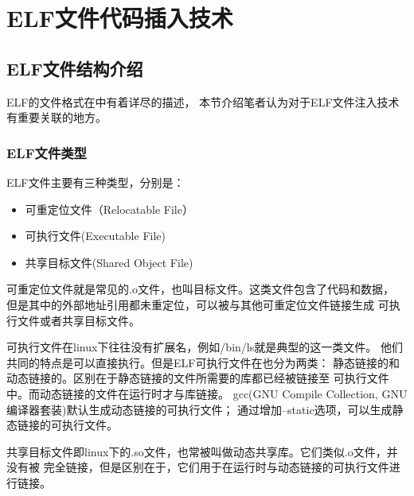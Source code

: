 \chapter{ELF文件代码插入技术}




\section{ELF文件结构介绍}


ELF的文件格式在\cite{elf1.2}中有着详尽的描述，
本节介绍笔者认为对于ELF文件注入技术有重要关联的地方。

\subsection{ELF文件类型}

ELF文件主要有三种类型，分别是：

\begin{itemize}
 \item 可重定位文件（Relocatable File）
 \item 可执行文件(Executable File)
 \item 共享目标文件(Shared Object File)
\end{itemize}

可重定位文件就是常见的.o文件，也叫目标文件。这类文件包含了代码和数据，
但是其中的外部地址引用都未重定位，可以被与其他可重定位文件链接生成
可执行文件或者共享目标文件。

可执行文件在linux下往往没有扩展名，例如/bin/ls就是典型的这一类文件。
他们共同的特点是可以直接执行。但是ELF可执行文件在也分为两类：
静态链接的和动态链接的。区别在于静态链接的文件所需要的库都已经被链接至
可执行文件中。而动态链接的文件在运行时才与库链接。
gcc(GNU Compile Collection, GNU编译器套装)默认生成动态链接的可执行文件；
通过增加--static选项，可以生成静态链接的可执行文件。

共享目标文件即linux下的.so文件，也常被叫做动态共享库。它们类似.o文件，并没有被
完全链接，但是区别在于，它们用于在运行时与动态链接的可执行文件进行链接。

